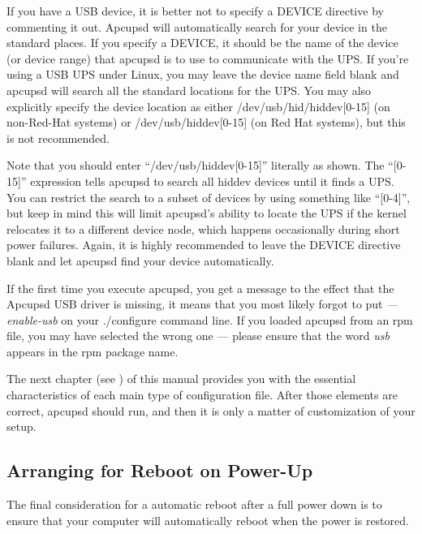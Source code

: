 If you have a USB device, it is better not to specify a DEVICE directive by
commenting it out. Apcupsd will automatically search for your device in the
standard places. If you specify a DEVICE, it should be the name of the device
(or device range) that apcupsd is to use to communicate with the UPS.  If
you're using a USB UPS under Linux, you may leave the device name field blank
and apcupsd will search all the standard locations for the UPS. You may also
explicitly specify the device location as either /dev/usb/hid/hiddev[0-15] (on
non-Red-Hat systems) or /dev/usb/hiddev[0-15] (on Red Hat systems), but this
is not recommended.  

Note that you should enter ``/dev/usb/hiddev[0-15]'' literally as shown.  The
``[0-15]'' expression tells apcupsd to search all hiddev devices until it
finds a UPS. You can restrict the search to a subset of devices by using
something like ``[0-4]'', but keep in mind this will limit apcupsd's ability
to locate the UPS if the kernel relocates it to a different device node, which
happens occasionally during short power failures. Again, it is highly
recommended to leave the DEVICE directive blank and let apcupsd find your
device automatically.  

If the first time you execute apcupsd, you get a message to the effect that
the Apcupsd USB driver is missing, it means that you most likely forgot to put
{\it {---}enable-usb} on your ./configure command line. If you loaded apcupsd
from an rpm file, you may have selected the wrong one {---} please ensure that
the word {\it usb} appears in the rpm package name.  

The next chapter (see 
) of this
manual provides you with the essential characteristics of each main type of
configuration file.  After those elements are correct, apcupsd should run, and
then it is only a matter of customization of your setup. 

\label{Arranging-for-Reboot-on-Power_002dUp}

\subsection*{Arranging for Reboot on Power-Up}

\label{index-Reboot-on-power-up-60}
\label{index-Power-up_002c-reboot-61}
The final consideration for a automatic reboot after a full power down is to
ensure that your computer will automatically reboot when the power is
restored.  

